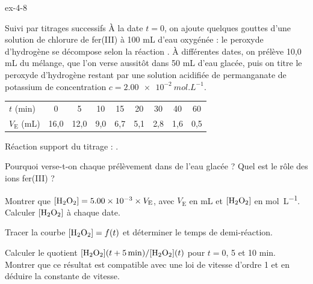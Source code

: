 \begin{blocLivre}{ex-4-8}
\begin{exercice}[2]{Suivi par titrages successifs}
À la date $t=0$, on ajoute quelques gouttes d'une solution de chlorure de fer(III) à 100 mL d'eau oxygénée : le
peroxyde d'hydrogène se décompose selon la réaction . À différentes dates, on prélève
10,0 mL du mélange, que l'on verse aussitôt dans 50 mL d'eau glacée, puis on titre le peroxyde d'hydrogène restant
par une solution acidifiée de permanganate de potassium de concentration $c=\qty{2,00e-2}{mol.L^{-1}}$.
\begin{center}\small\renewcommand{\arraystretch}{1.2}
\begin{tabular}{@{}l*{8}{c}@{}}\toprule
$t$ (min) & 0 & 5 & 10 & 15 & 20 & 30 & 40 & 60\\
$V_\mathrm{E}$ (mL) & 16,0 & 12,0 & 9,0 & 6,7 & 5,1 & 2,8 & 1,6 & 0,5\\\bottomrule
\end{tabular}\end{center}
\begin{donnees}
Réaction support du titrage : .
\end{donnees}
\begin{questions}
\item Pourquoi verse-t-on chaque prélèvement dans de l'eau glacée ? Quel est le rôle des ions fer(III) ?
\item Montrer que $[\ce{H2O2}]=\num{5.00e-3}\times V_\mathrm{E}$, avec $V_\mathrm{E}$ en mL et $[\ce{H2O2}]$ en
\unit{mol.L^{-1}}. Calculer $[\ce{H2O2}]$ à chaque date.
\item Tracer la courbe $[\ce{H2O2}]=f(t)$ et déterminer le temps de demi-réaction.
\item Calculer le quotient $[\ce{H2O2}](t+\qty{5}{min})/[\ce{H2O2}](t)$ pour $t=0$, 5 et 10 min. Montrer que ce
résultat est compatible avec une loi de vitesse d'ordre 1 et en déduire la constante de vitesse.
\end{questions}
\end{exercice}
\end{blocLivre}
